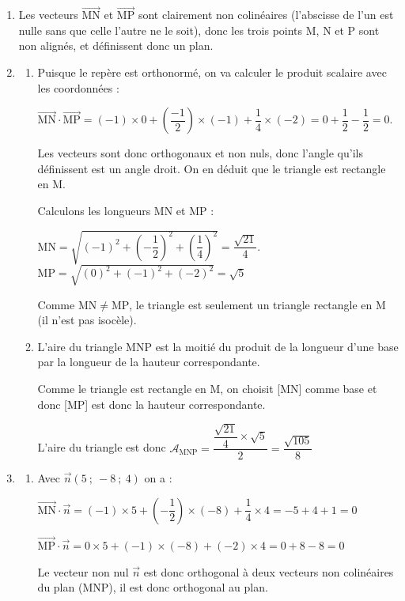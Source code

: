 \documentclass[10pt]{article}
\providecommand{\vect}[1]{\overrightarrow{#1}}
\begin{document}
\begin{enumerate}
\item Les vecteurs $\vect{\mathrm{MN}}$ et $\vect{\mathrm{MP}}$ sont clairement non colinéaires (l'abscisse de l'un est nulle sans que celle l'autre ne le soit), donc les trois points M, N et P sont non alignés, et définissent donc un plan.

\item
	\begin{enumerate}
		\item Puisque le repère est orthonormé, on va calculer le produit scalaire avec les coordonnées :

$\vect{\text{MN}} \cdot \vect{\text{MP}} = (-1)\times 0 + \left(\dfrac{-1}{2}\right) \times (-1) + \dfrac{1}{4}\times (-2) = 0 + \dfrac{1}{2} - \dfrac{1}{2} = 0 $.

Les vecteurs sont donc orthogonaux et non nuls, donc l'angle qu'ils définissent est un angle droit. On en déduit que le triangle est rectangle en M.

Calculons les longueurs MN et MP :

$\mathrm{MN} = \sqrt{\left(-1\right)^2+\left(-\dfrac{1}{2}\right)^2+\left(\dfrac{1}{4}\right)^2 } = \dfrac{\sqrt{21}}{4}$.
\qquad
$\mathrm{MP} = \sqrt{\left(0\right)^2+\left(-1\right)^2+\left(-2\right)^2} = \sqrt{5}$

Comme $\mathrm{MN} \neq \mathrm{MP}$, le triangle est seulement un triangle rectangle en M (il n'est pas isocèle).

	\item L'aire du triangle MNP est la moitié du produit de la longueur d'une base par la longueur de la hauteur correspondante.

Comme le triangle est rectangle en M, on choisit [MN] comme base et donc [MP] est donc la hauteur correspondante.

L'aire du triangle est donc $\mathcal{A}_{\mathrm{MNP}} = \dfrac{\dfrac{\sqrt{21}}{4}\times \sqrt{5}}{2} = \dfrac{\sqrt{105}}{8}$
	\end{enumerate}
\item
	\begin{enumerate}
		\item Avec $\vect{n}(5~;~-8~;~4)$ on a :

$\vect{\mathrm{MN}}\cdot \vect{n} = (-1)\times 5 + \left(-\dfrac{1}{2}\right) \times (-8) + \dfrac{1}{4} \times 4 = -5 + 4 + 1 = 0$

$\vect{\mathrm{MP}}\cdot \vect{n} = 0\times 5 + (-1) \times (-8) + (-2) \times 4 = 0 + 8 -8 = 0$

Le vecteur non nul $\vect{n}$ est donc orthogonal à deux vecteurs non colinéaires du plan (MNP), il est donc orthogonal au plan.


\end{enumerate}
\end{enumerate}
\end{document}
